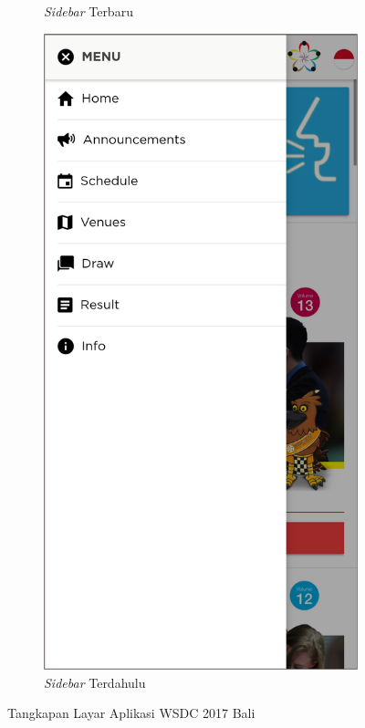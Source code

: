 \begin{figure}[H]
\begin{subfigure}[b]{0.3\textwidth}
         \caption{\textit{Sidebar} Terbaru}
         \label{fig:ssSidebar}
     \end{subfigure}
     \hspace*{0.5in}
     \begin{subfigure}[b]{0.3\textwidth}
         \centering
         \includegraphics[width=\textwidth]{Gambar/SideBarOld.png}
         \caption{\textit{Sidebar} Terdahulu}
         \label{fig:ssSidebarOld}
     \end{subfigure}
        \caption{Tangkapan Layar Aplikasi WSDC 2017 Bali}
        \label{fig:ssApk1}
\end{figure}


